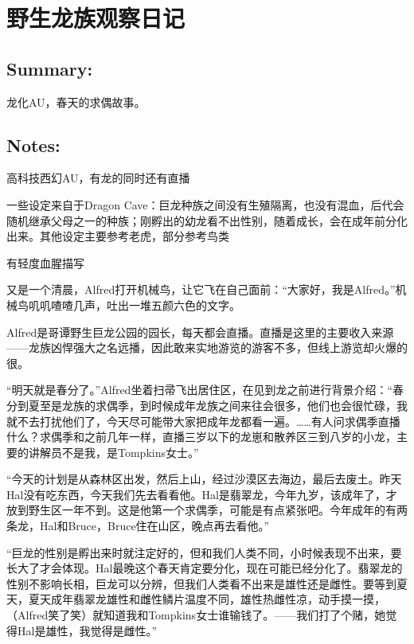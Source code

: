 \documentclass[../main.tex]{subfiles}
\begin{document}
\pagestyle{mystyle}

\chapter{野生龙族观察日记}

\vspace{3cm}

\section*{Summary:}

龙化AU，春天的求偶故事。

\section*{Notes:}
高科技西幻AU，有龙的同时还有直播

一些设定来自于Dragon Cave：巨龙种族之间没有生殖隔离，也没有混血，后代会随机继承父母之一的种族；刚孵出的幼龙看不出性别，随着成长，会在成年前分化出来。其他设定主要参考老虎，部分参考鸟类

有轻度血腥描写

\addnotes

又是一个清晨，Alfred打开机械鸟，让它飞在自己面前：``大家好，我是Alfred。''机械鸟叽叽喳喳几声，吐出一堆五颜六色的文字。

Alfred是哥谭野生巨龙公园的园长，每天都会直播。直播是这里的主要收入来源------龙族凶悍强大之名远播，因此敢来实地游览的游客不多，但线上游览却火爆的很。

``明天就是春分了。''Alfred坐着扫帚飞出居住区，在见到龙之前进行背景介绍：``春分到夏至是龙族的求偶季，到时候成年龙族之间来往会很多，他们也会很忙碌，我就不去打扰他们了，今天尽可能带大家把成年龙都看一遍。\ldots\ldots 有人问求偶季直播什么？求偶季和之前几年一样，直播三岁以下的龙崽和散养区三到八岁的小龙，主要的讲解员不是我，是Tompkins女士。''

``今天的计划是从森林区出发，然后上山，经过沙漠区去海边，最后去废土。昨天Hal没有吃东西，今天我们先去看看他。Hal是翡翠龙，今年九岁，该成年了，才放到野生区一年不到。这是他第一个求偶季，可能是有点紧张吧。今年成年的有两条龙，Hal和Bruce，Bruce住在山区，晚点再去看他。''

``巨龙的性别是孵出来时就注定好的，但和我们人类不同，小时候表现不出来，要长大了才会体现。Hal最晚这个春天肯定要分化，现在可能已经分化了。翡翠龙的性别不影响长相，巨龙可以分辨，但我们人类看不出来是雄性还是雌性。要等到夏天，夏天成年翡翠龙雄性和雌性鳞片温度不同，雄性热雌性凉，动手摸一摸，（Alfred笑了笑）就知道我和Tompkins女士谁输钱了。------我们打了个赌，她觉得Hal是雄性，我觉得是雌性。''
\end{document}
